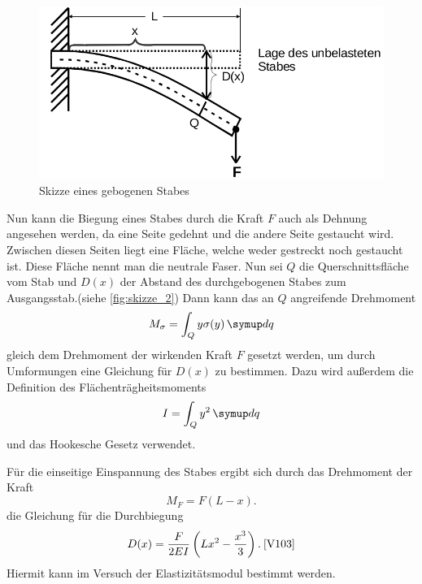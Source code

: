  
\begin{figure}
    \centering
    \includegraphics[width=\textwidth/2]{images/skizze_2.png}
    \caption{Skizze eines gebogenen Stabes\cite{V103}}
    \label{fig:skizze_2}
\end{figure}
Nun kann die Biegung eines Stabes durch die Kraft $F$ auch als Dehnung angesehen werden, da eine Seite gedehnt und die andere Seite gestaucht wird.
Zwischen diesen Seiten liegt eine Fläche, welche weder gestreckt noch gestaucht ist.
Diese Fläche nennt man die neutrale Faser. Nun sei $Q$ die Querschnittsfläche vom Stab und $D(x)$ der Abstand des durchgebogenen Stabes zum Ausgangsstab.(siehe \autoref{fig:skizze_2})
Dann kann das an $Q$ angreifende Drehmoment
\begin{equation}
    M_\sigma = \int_Q y\sigma(y)\dif{q}
    \label{eq:drehmoment_sigma}
\end{equation}
gleich dem Drehmoment der wirkenden Kraft $F$ gesetzt werden, um durch Umformungen eine Gleichung für $D(x)$ zu bestimmen.
Dazu wird außerdem die Definition des Flächenträgheitsmoments
\begin{equation}
    I = \int_Q y^2 \dif{q}
    \label{eq:flächentragheitsmoment}
\end{equation}
und das Hookesche Gesetz verwendet.

Für die einseitige Einspannung des Stabes ergibt sich durch das Drehmoment der Kraft
\begin{equation}
    M_F = F (L-x).
    \label{eq:drehmoment_einseitig}
\end{equation}
die Gleichung für die Durchbiegung
\begin{equation}
    D(x) = \frac{F}{2EI} \left( Lx^2 - \frac{x^3}{3} \right). \: \text{\cite{V103}}
    \label{eq:durchbiegung_einseitig}
\end{equation}
Hiermit kann im Versuch der Elastizitätsmodul bestimmt werden.


